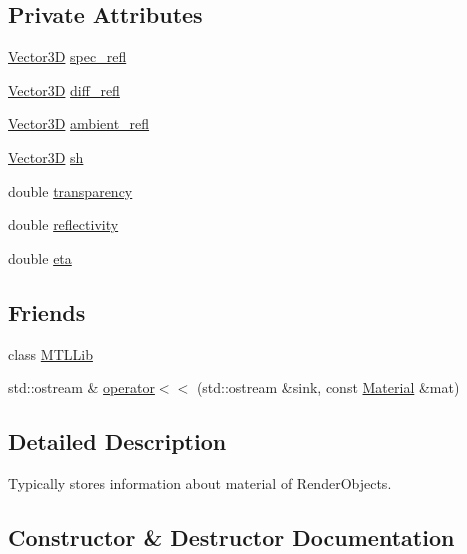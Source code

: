 \subsection*{Private Attributes}
\begin{DoxyCompactItemize}
\item 
\hyperlink{classVector3D}{Vector3D} \hyperlink{classMaterial_a8b1858703e3298ba1cc705684939f953}{spec\+\_\+refl}
\item 
\hyperlink{classVector3D}{Vector3D} \hyperlink{classMaterial_af53038fbe5bbe5d1a9801aabc97543a5}{diff\+\_\+refl}
\item 
\hyperlink{classVector3D}{Vector3D} \hyperlink{classMaterial_a40002cba7c7049feb2bddaf57ae96ba4}{ambient\+\_\+refl}
\item 
\hyperlink{classVector3D}{Vector3D} \hyperlink{classMaterial_a886d30c3aaf819eea8f619c5ecc21f92}{sh}
\item 
double \hyperlink{classMaterial_a02abe03436775e128e04e1c737d34067}{transparency}
\item 
double \hyperlink{classMaterial_a050f60e6002271e571c4e5afc4b097b5}{reflectivity}
\item 
double \hyperlink{classMaterial_a62e8368c76c975790315b16d97558c26}{eta}
\end{DoxyCompactItemize}
\subsection*{Friends}
\begin{DoxyCompactItemize}
\item 
class \hyperlink{classMaterial_aa4d43ed50061aeb4600daf1e3f7706ac}{M\+T\+L\+Lib}
\item 
std\+::ostream \& \hyperlink{classMaterial_acf2af134f767709233736d54356180be}{operator$<$$<$} (std\+::ostream \&sink, const \hyperlink{classMaterial}{Material} \&mat)
\end{DoxyCompactItemize}


\subsection{Detailed Description}
Typically stores information about material of Render\+Objects. 

\subsection{Constructor \& Destructor Documentation}
